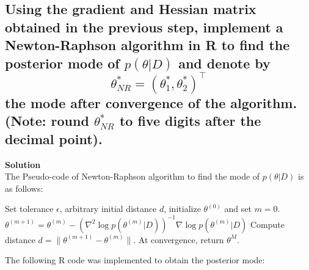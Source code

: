 \documentclass[12pt]{article}
\begin{document}
\subsection{Using the gradient and Hessian matrix obtained in the previous step, implement a Newton-Raphson algorithm in R to find the posterior mode of \( p(\theta|D) \) and denote by
\[
\theta^*_{NR} = (\theta^*_1, \theta^*_2)^\top
\]
the mode after convergence of the algorithm. (Note: round \( \theta^*_{NR} \) to five digits after the decimal point).}
\textbf{Solution}\\
The Pseudo-code of Newton-Raphson algorithm to find the mode of \( p(\theta|D) \) is as follows:

\begin{algorithm}
\begin{algorithmic}[1]
\State Set tolerance \( \epsilon \), arbitrary initial distance \( d \), initialize \( \theta^{(0)} \) and set \( m = 0 \).
    \State \( \theta^{(m+1)} = \theta^{(m)} - \left( \nabla^2 \log p(\theta^{(m)}|D) \right)^{-1} \nabla \log p(\theta^{(m)}|D) \)
    \State Compute distance \( d = \|\theta^{(m+1)} - \theta^{(m)}\| \).
\EndWhile
\State At convergence, return \( \theta^M \).
\end{algorithmic}
\end{algorithm}

The following R code was implemented to obtain the posterior mode:

\end{document}
